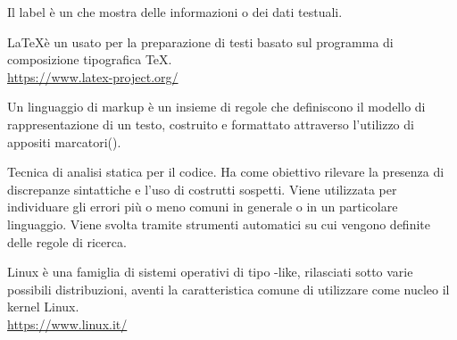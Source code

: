 Il label è un  che mostra delle informazioni o dei dati testuali.

\LaTeX è un  usato per la preparazione di testi basato sul programma di composizione tipografica \TeX.\\
\url{https://www.latex-project.org/}

Un linguaggio di markup è un insieme di regole che definiscono il modello di rappresentazione di un testo, costruito e formattato attraverso l’utilizzo di appositi marcatori().

Tecnica di analisi statica per il codice. Ha come obiettivo rilevare la presenza di discrepanze sintattiche e l’uso di costrutti sospetti. Viene utilizzata per individuare gli errori più o meno comuni in generale o in un particolare linguaggio. Viene svolta tramite strumenti automatici su cui vengono definite delle regole di ricerca.

Linux è una famiglia di sistemi operativi di tipo -like, rilasciati sotto varie possibili distribuzioni, aventi la caratteristica comune di utilizzare come nucleo il kernel Linux.\\
\url{https://www.linux.it/}
\clearpage